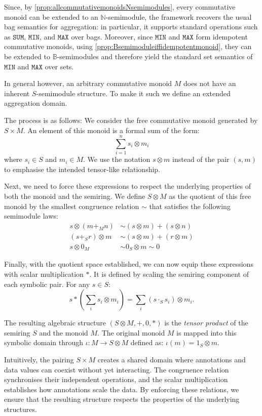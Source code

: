 \documentclass[oneside, 11pt]{amsbook}
\theoremstyle{plain}
\theoremstyle{definition}
\theoremstyle{remark}
\begin{document}
Since, by \autoref{prop:allcommutativemonoidsNsemimodules}, every commutative monoid can be extended to an $\mathbb{N}$-semimodule, the framework recovers the usual bag semantics for aggregation: in particular, it supports standard operations such as $\texttt{SUM}$, $\texttt{MIN}$, and $\texttt{MAX}$ over bags. Moreover, since $\texttt{MIN}$ and $\texttt{MAX}$ form idempotent commutative monoids, using \autoref{prop:Bsemimoduleiffidempotentmonoid}, they can be extended to $\mathbb{B}$-semimodules and therefore yield the standard set semantics of $\texttt{MIN}$ and $\texttt{MAX}$ over sets.

In general however, an arbitrary commutative monoid $M$ does not have an inherent $S$-semimodule structure. To make it such we define an extended aggregation domain.

The process is as follows: We consider the free commutative monoid generated by $S \times M$. An element of this monoid is a formal sum of the form:
\[
    \sum_{i=1}^n s_i \otimes m_i
\]
where $s_i \in S$ and $m_i \in M$. We use the notation $s \otimes m$ instead of the pair $(s, m)$ to emphasise the intended tensor-like relationship.

Next, we need to force these expressions to respect the underlying properties of both the monoid and the semiring. We define $S \otimes M$ as the quotient of this free monoid by the smallest congruence relation $\sim$ that satisfies the following semimodule laws:
\[
    \begin{aligned}
        s \otimes (m +_M n) & \sim (s \otimes m) + (s \otimes n) \\
        (s +_S r) \otimes m & \sim (s \otimes m) + (r \otimes m) \\
        s \otimes 0_M       & \sim 0_S \otimes m \sim 0
    \end{aligned}
\]

Finally, with the quotient space established, we can now equip these expressions with scalar multiplication $\ast$. It is defined by scaling the semiring component of each symbolic pair. For any $s \in S$:
\[
    s * \left( \sum_{i} s_i \otimes m_i \right) = \sum_{i} (s \cdot_S s_i) \otimes m_i.
\]

The resulting algebraic structure $(S \otimes M, +, 0, *)$ is the \emph{tensor product} of the semiring $S$ and the monoid $M$. The original monoid $M$ is mapped into this symbolic domain through $\iota: M \to S \otimes M$ defined as: $\iota(m) = 1_S \otimes m$.

Intuitively, the pairing $S \times M$ creates a shared domain where annotations and data values can coexist without yet interacting. The congruence relation synchronises their independent operations, and the scalar multiplication establishes how annotations scale the data. By enforcing these relations, we ensure that the resulting structure respects the properties of the underlying structures.
\end{document}
